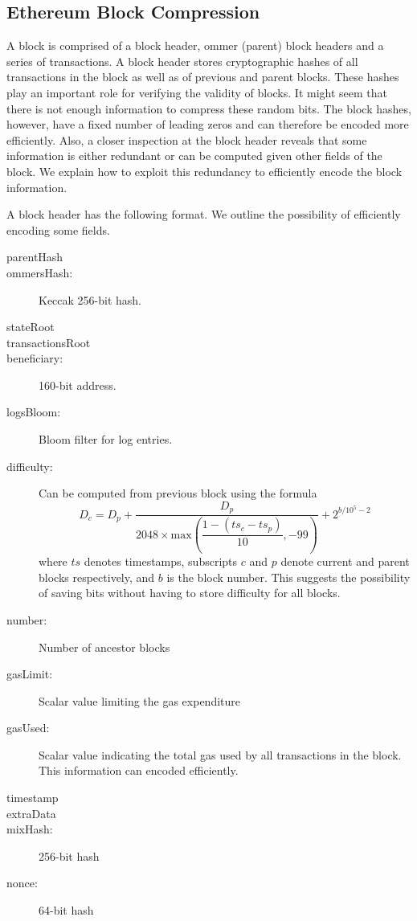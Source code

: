 \subsection{Ethereum Block Compression}\label{sec:blockcompress}

A block is comprised of a block header, ommer (parent) block headers and a series of transactions. 
A block header stores cryptographic hashes of all transactions in the block as well as of previous and parent blocks.
These hashes play an important role for verifying the validity of blocks.
It might seem that there is not enough information to compress these random bits. 
The block hashes, however, have a fixed number of leading zeros and
can therefore be encoded more efficiently.
Also, a closer inspection at the block header reveals that 
some information is either redundant or can be computed given other fields of the block.
We explain how to exploit this redundancy to efficiently encode the block information.

A block header has the following format. We outline the possibility of efficiently encoding some fields. 
\begin{description}
 \item[parentHash] 
 \item[ommersHash:]  Keccak 256-bit hash.
 \item[stateRoot]  
 \item[transactionsRoot]
 \item[beneficiary:]160-bit address.
 \item[logsBloom:] Bloom filter for log entries.
 \item[difficulty:] Can be computed from previous block using the formula
 $$
 D_{c} = D_{p} + \dfrac{D_{p}}{2048\times\textrm{max}\left(\dfrac{1 - (ts_{c} - ts_{p})}{10}, -99\right)} + 2^{b/10^5-2}
 $$
 where $ts$ denotes timestamps, subscripts $c$ and $p$ denote current and parent blocks respectively, and $b$ is the block number.
 This suggests the possibility of saving bits without having to store difficulty for all blocks.
 \item[number:] Number of ancestor blocks
 \item[gasLimit:] Scalar value limiting the gas expenditure
 \item[gasUsed:] Scalar value indicating the total gas used by all transactions in the block. This information can encoded efficiently.
 \item[timestamp]
 \item[extraData]
 \item[mixHash:] 256-bit hash
 \item[nonce:] 64-bit hash
\end{description}

